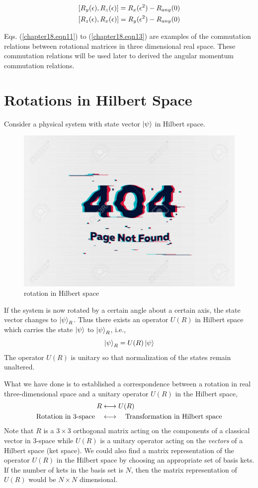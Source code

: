 \begin{align}
\label{chapter18.eqn12}
\comm{R_y(\epsilon)}{R_z(\epsilon)} = R_x(\epsilon^2) - R_{any}(0)\\
\label{chapter18.eqn13}
\comm{R_z(\epsilon)}{R_x(\epsilon)} = R_y(\epsilon^2) - R_{any}(0)
\end{align}

Eqs. (\ref{chapter18.eqn11}) to (\ref{chapter18.eqn13}) are examples of the commutation relations between rotational matrices in three dimensional real space. These commutation relations will be used later to derived the angular momentum commutation relations.



\section{Rotations in Hilbert Space}

Consider a physical system with state vector $\ket{\psi}$ in Hilbert space.
\begin{figure}
	\centering
	\includegraphics[width=0.5\linewidth]{Pictures/not-found.jpg}
	\caption{rotation in Hilbert space}
	\label{chapter18.fig3}
\end{figure}
If the system is now rotated by a certain angle about a certain axis, the state vector changes to $\ket{\psi}_R$. Thus there exists an operator $U(R)$ in Hilbert space which carries the state $\ket{\psi}$ to $\ket{\psi}_R$, i.e.,
\begin{equation}
\label{chapter18.eqn14}
\ket{\psi}_R = U(R) \ket{\psi}
\end{equation}
The operator $U(R)$ is unitary so that normalization of the states remain unaltered.


What we have done is to established a correspondence between a rotation in real three-dimensional space and a unitary operator $U(R)$ in the Hilbert space,
\begin{align*}
R &\longleftrightarrow U(R) \\
\qq{Rotation in 3-space}& \longleftrightarrow \qq{Transformation in Hilbert space}
\end{align*}
Note that $R$ is a $3\times 3$ orthogonal matrix acting on the components of a classical vector in $3$-space while $U(R)$ is a unitary operator acting on the \textit{vectors} of a Hilbert space (ket space). We could also find a matrix representation of the operator $U(R)$ in the Hilbert space by choosing an appropriate set of basis kets. If the number of kets in the basis set is $N$, then the matrix representation of $U(R)$ would be $N\times N$ dimensional.

